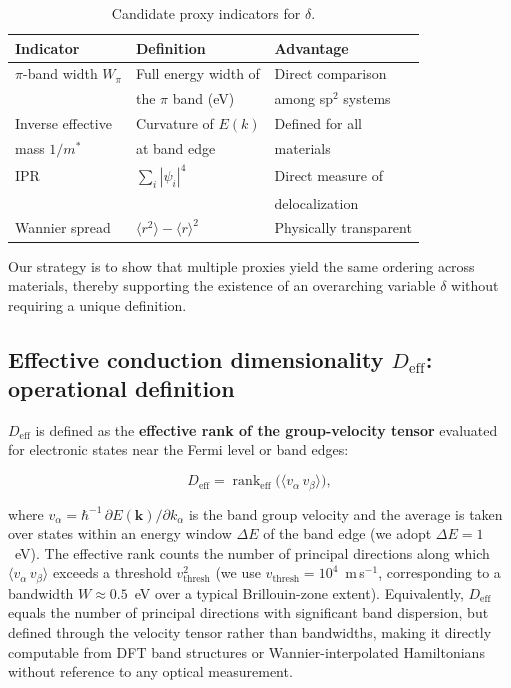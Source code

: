 \documentclass[twocolumn,showpacs,preprintnumbers,amsmath,amssymb,prb]{revtex4-2}
\begin{document}
\begin{table}[h]
\caption{Candidate proxy indicators for $\delta$.}
\label{tab:delta_proxies}
\begin{ruledtabular}
\begin{tabular}{lll}
  Indicator & Definition & Advantage \\
  \hline
  $\pi$-band width $W_\pi$ & Full energy width of & Direct comparison \\
   & the $\pi$ band (eV) & among sp$^2$ systems \\
  Inverse effective & Curvature of $E(k)$ & Defined for all \\
  mass $1/m^*$ & at band edge & materials \\
  IPR & $\sum_i |\psi_i|^4$ & Direct measure of \\
   & & delocalization \\
  Wannier spread & $\langle r^2 \rangle - \langle r \rangle^2$ &
  Physically transparent \\
\end{tabular}
\end{ruledtabular}
\end{table}

Our strategy is to show that multiple proxies yield the same ordering
across materials, thereby supporting the existence of an overarching
variable $\delta$ without requiring a unique definition.

\subsection{Effective conduction dimensionality $D_\mathrm{eff}$:
  operational definition}
\label{sec:Deff}

$D_\mathrm{eff}$ is defined as the \textbf{effective rank of the
group-velocity tensor} evaluated for electronic states near the Fermi
level or band edges:

\begin{equation}
  D_\mathrm{eff}
    = \operatorname{rank}_\mathrm{eff}\!\bigl(\langle v_\alpha\, v_\beta \rangle\bigr),
  \label{eq:Deff}
\end{equation}

\noindent where $v_\alpha = \hbar^{-1}\,\partial E(\bm{k})/\partial k_\alpha$
is the band group velocity and the average is taken over states within
an energy window $\Delta E$ of the band edge (we adopt
$\Delta E = 1$~eV). The effective rank counts the number of principal
directions along which $\langle v_\alpha\, v_\beta \rangle$ exceeds a
threshold $v_\mathrm{thresh}^2$ (we use
$v_\mathrm{thresh} = 10^{4}$~m\,s$^{-1}$, corresponding to a
bandwidth $W \approx 0.5$~eV over a typical Brillouin-zone extent).
Equivalently, $D_\mathrm{eff}$ equals the number of principal
directions with significant band dispersion, but defined through the
velocity tensor rather than bandwidths, making it directly computable
from DFT band structures or Wannier-interpolated Hamiltonians without
reference to any optical measurement.
\end{document}
